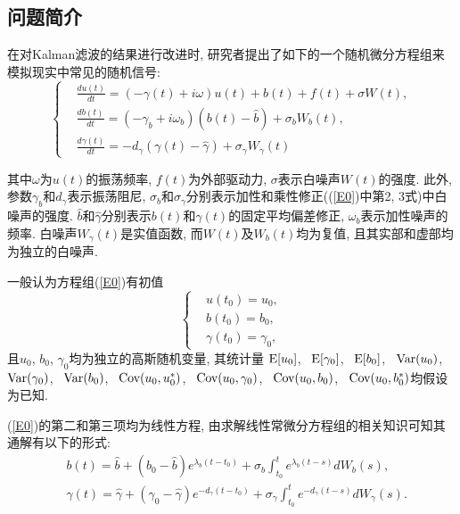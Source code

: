 \documentclass[notitlepage,cs4size,punct,oneside]{ctexrep}
\numberwithin{equation}{section}
\theoremstyle{mystyle}
\begin{document}
\subsection{问题简介}
在对Kalman滤波的结果进行改进时, 研究者提出了如下的一个随机微分方程组来模拟现实中常见的随机信号\cite{gershgorin2010test}:
\begin{equation} \label{E0}
\left\{
\begin{split}
& \frac{du(t)}{dt} = (-\gamma(t)+i\omega)u(t)+b(t)+f(t)+\sigma W(t), \\[5pt]
& \frac{db(t)}{dt} = (-\gamma_b+i\omega_b)(b(t)-\hat{b})+\sigma_b W_b(t), \\[5pt]
& \frac{d\gamma(t)}{dt} = -d_\gamma(\gamma(t)-\hat{\gamma})+\sigma_\gamma W_\gamma(t)
\end{split}
\right.
\end{equation}

其中$\omega$为$u(t)$的振荡频率, $f(t)$为外部驱动力, $\sigma$表示白噪声$W(t)$的强度. 此外, 参数$\gamma_b$和$d_\gamma$表示振荡阻尼, $\sigma_b$和$\sigma_\gamma$分别表示加性和乘性修正((\ref{E0})中第2, 3式)中白噪声的强度. $\hat{b}$和$\hat{\gamma}$分别表示$b(t)$和$\gamma(t)$的固定平均偏差修正, $\omega_b$表示加性噪声的频率. 白噪声$W_\gamma(t)$是实值函数, 而$W(t)$及$W_b(t)$均为复值, 且其实部和虚部均为独立的白噪声. 

一般认为方程组(\ref{E0})有初值
\begin{equation} \label{init_values}
\left\{
\begin{split}
& u(t_0) = u_0, \\[5pt]
& b(t_0) = b_0, \\[5pt]
& \gamma(t_0) = \gamma_0,
\end{split}
\right.
\end{equation}
且$u_0$, $b_0$, $\gamma_0$均为独立的高斯随机变量, 其统计量
$\text{E}[u_0]$, ~$\text{E}[\gamma_0]$, ~$\text{E}[b_0]$, ~$\text{Var}(u_0)$, ~$\text{Var}(\gamma_0)$, ~$\text{Var}(b_0)$, ~$\text{Cov}(u_0, u_0^*)$, ~$\text{Cov}(u_0, \gamma_0)$, ~$\text{Cov}(u_0, b_0)$, ~$\text{Cov}(u_0, b_0^*)$均假设为已知.

(\ref{E0})的第二和第三项均为线性方程, 由求解线性常微分方程组的相关知识\cite{fulinjin1984ordinary}可知其通解有以下的形式:
\begin{equation} \label{Sb}
\begin{split}
&b(t) = \hat{b}+(b_0-\hat{b})e^{\lambda_b(t-t_0)}+\sigma_b\int_{t_0}^t e^{\lambda_b(t-s)}dW_b(s), \\[5pt]
&\gamma(t) = \hat{\gamma}+(\gamma_0-\hat{\gamma})e^{-d_{\gamma}(t-t_0)}+\sigma_{\gamma}\int_{t_0}^t e^{-d_{\gamma}(t-s)}dW_{\gamma}(s).
\end{split}
\end{equation}
\end{document}
